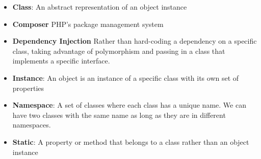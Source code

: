 \begin{itemize}[leftmargin=*]
    \item
        \textbf{Class}:
        An abstract representation of an object instance
    \item
        \textbf{Composer}
        PHP's package management system
    \item
        \textbf{Dependency Injection}
        Rather than hard-coding a dependency on a specific class, taking advantage of polymorphism and passing in a class that implements a specific interface.
    \item
        \textbf{Instance}:
        An object is an instance of a specific class with its own set of properties
    \item
        \textbf{Namespace}:
        A set of classes where each class has a unique name. We can have two classes with the same name as long as they are in different namespaces.
    \item
        \textbf{Static}:
        A property or method that belongs to a class rather than an object instance
\end{itemize}
